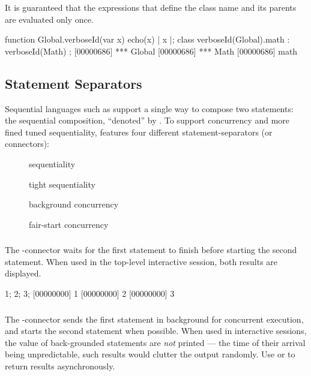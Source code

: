 It is guaranteed that the expressions that define the class name and its
parents are evaluated only once.

\begin{urbiscript}
function Global.verboseId(var x)
{
  echo(x) | x
}|;
class verboseId(Global).math : verboseId(Math)
{
};
[00000686] *** Global
[00000686] *** Math
[00000686] math
\end{urbiscript}


\subsection{Statement Separators}
\label{sec:lang:separators}

Sequential languages such as \Cxx support a single way to compose two
statements: the sequential composition, ``denoted'' by \samp{;}.  To
support concurrency and more fined tuned sequentiality, \us features
four different statement-separators (or connectors):
\begin{description}
\item[\samp{;}] sequentiality
\item[\samp{|}] tight sequentiality
\item[\samp{,}] background concurrency
\item[\samp{\&}] fair-start concurrency
\end{description}

\subsubsection{\samp{;}}

The \samp{;}-connector waits for the first statement to finish before
starting the second statement.  When used in the top-level interactive
session, both results are displayed.

\begin{urbiscript}
1; 2; 3;
[00000000] 1
[00000000] 2
[00000000] 3
\end{urbiscript}

\subsubsection{\samp{,}}
\label{sec:lang:comma}
The \samp{,}-connector sends the first statement in background for
concurrent execution, and starts the second statement when possible.
When used in interactive sessions, the value of back-grounded
statements are \emph{not} printed --- the time of their arrival being
unpredictable, such results would clutter the output randomly.  Use
 or  to return results
asynchronously.

